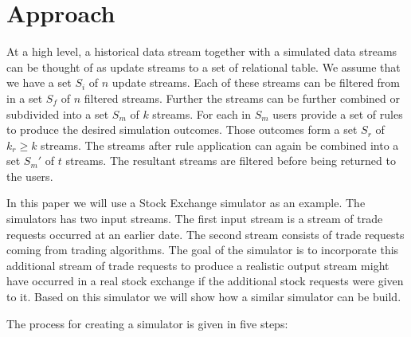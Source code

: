 \documentclass{article}
\begin{document}
\section{Approach}

At a high level, a historical data stream together with a simulated data streams can be thought of as update streams to a set of relational table. We assume that we have a set $S_i$ of $n$ update streams. Each of these streams can be filtered from in a set $S_f$ of $n$ filtered streams. Further the streams can be further combined or subdivided into a set $S_m$ of $k$ streams. For each in $S_m$ users provide a set of rules to produce the desired simulation outcomes. Those outcomes form a set $S_r$ of $k_r \geq k$ streams. The streams after rule application can again be combined into a set $S_m '$ of $t$ streams. The resultant streams are filtered before being returned to the users.
 
In this paper we will use a Stock Exchange simulator as an example. The simulators has two input streams. The first input stream is a stream of trade requests occurred at an earlier date. The second stream consists of trade requests coming from trading algorithms. The goal of the simulator is to incorporate this additional stream of trade requests to produce a realistic output stream might have occurred in a real stock exchange if the additional stock requests were given to it. Based on this simulator we will show how a similar simulator can be build. 


The process for creating a simulator is given in five steps:
\end{document}
